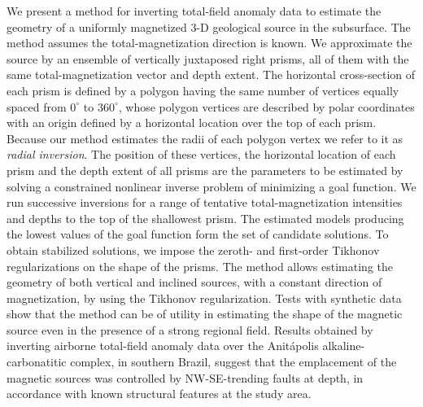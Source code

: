 \begin{summary}
We present a method for inverting total-field anomaly data to estimate the geometry of 
a uniformly magnetized 3-D geological source in the subsurface. The method assumes 
the total-magnetization direction is known. 
We approximate the source by an ensemble of vertically juxtaposed right prisms, all of them with the same total-magnetization vector and depth extent. 
The horizontal cross-section of each prism is defined by a polygon having the same number of vertices equally spaced from $0^{\circ}$ to $360^{\circ}$,  whose polygon vertices  
are described by polar coordinates with an origin defined by a horizontal location 
over the top of each prism. 
Because our method estimates the radii of each polygon vertex  we refer to it as 
\textit{radial inversion}.
The position of these vertices, the horizontal location of each prism and the depth extent of all prisms are the parameters to be estimated by solving a constrained nonlinear inverse problem of minimizing a goal function. 
We run successive inversions for a range of tentative total-magnetization intensities 
and depths to the top of the shallowest prism. The estimated models producing 
the lowest values of the goal function form the set of candidate solutions.
To obtain stabilized solutions, we impose the zeroth- and first-order Tikhonov 
regularizations on the shape of the prisms. The method allows estimating the geometry 
of both vertical and inclined sources, with a constant direction of magnetization, 
by using the Tikhonov regularization. 
Tests with synthetic data show that the method can be of utility in estimating the shape of the magnetic source even in the presence of a strong regional field.
Results obtained by inverting airborne total-field anomaly data over the 
Anit{\'a}polis alkaline-carbonatitic complex, in southern Brazil, 
suggest that the emplacement of the magnetic sources was controlled by NW-SE-trending 
faults at depth, in accordance with known structural features at the study area.
\end{summary}
